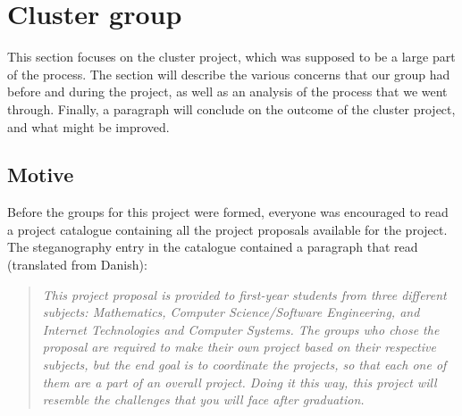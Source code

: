 \section{Cluster group}
This section focuses on the cluster project, which was supposed to be a large part of the process. The section will describe the various concerns that our group had before and during the project, as well as an analysis of the process that we went through. Finally, a paragraph will conclude on the outcome of the cluster project, and what might be improved.

\subsection{Motive}
Before the groups for this project were formed, everyone was encouraged to read a project catalogue containing all the project proposals available for the project.
The steganography entry in the catalogue contained a paragraph that read (translated from Danish):
\begin{quote}\textit{This project proposal is provided to first-year students from three different subjects: Mathematics, Computer Science/Software Engineering, and Internet Technologies and Computer Systems.
The groups who chose the proposal are required to make their own project based on their respective subjects, but the end goal is to coordinate the projects, so that each one of them are a part of an overall project.
Doing it this way, this project will resemble the challenges that you will face after graduation.}\end{quote}

